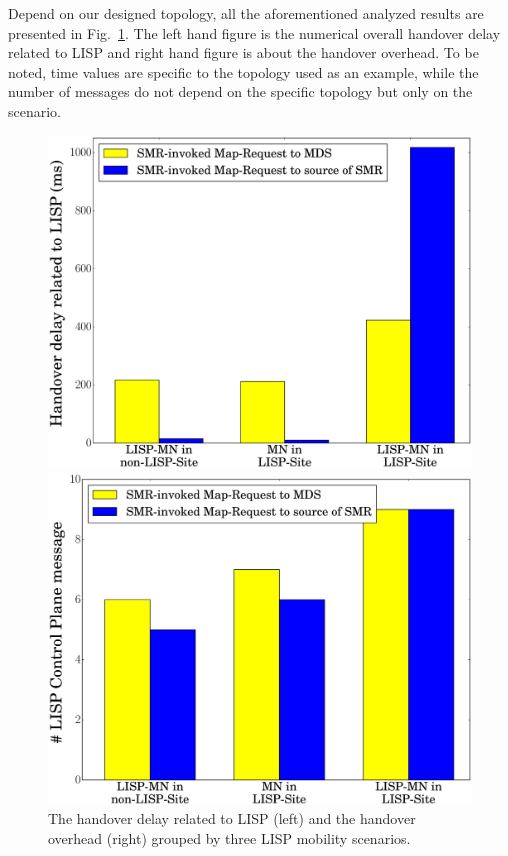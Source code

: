 Depend on our designed topology, all the aforementioned analyzed results are presented in Fig.~\ref{handover_delay_overhead_bar}. The left hand figure is the numerical overall handover delay related to LISP and right hand figure is about the handover overhead. To be noted, time values are specific to the topology used as an example, while the number of messages do not depend on the specific topology but only on the scenario.
\begin{figure}[!t]
	\begin{minipage}[c]{.5\linewidth}
		\begin{center}
			\includegraphics[width=\linewidth]{Pics/LISP_handover_delay_Bar.eps}
		\end{center}
	\end{minipage}
	\begin{minipage}[c]{.5\linewidth}
		\begin{center}
			\includegraphics[width=\linewidth]{Pics/LISP_handover_overhead_Bar}
		\end{center}
	\end{minipage}
	\caption{The handover delay related to LISP (left) and the handover overhead (right) grouped by three LISP mobility scenarios.}
	\label{handover_delay_overhead_bar}
\end{figure}

